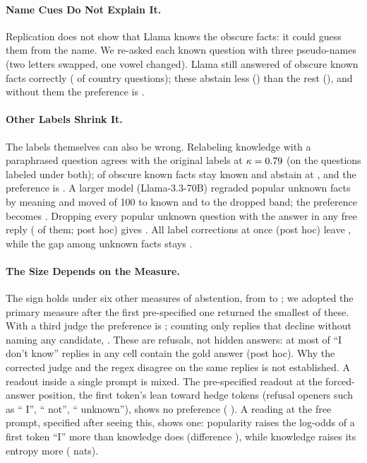 \documentclass[manuscript,screen,review,anonymous,nonacm]{acmart}
\newcommand{\idk}{``I don't know''}
\begin{document}
\paragraph{Name Cues Do Not Explain It.} Replication does not show that Llama knows the obscure facts: it could guess them from the name. We re-asked each known question with three pseudo-names (two letters swapped, one vowel changed). Llama still answered \ncObsRec{} of \ncObsProbed{} obscure known facts correctly (\ncCountryRec{} of \ncCountryN{} country questions); these abstain less (\ncRecAbs) than the rest (\ncOtherAbs), and without them the preference is \ncDiff{} \ncDiffCI.

\paragraph{Other Labels Shrink It.} The labels themselves can also be wrong. Relabeling knowledge with a paraphrased question agrees with the original labels at $\kappa=0.79$ (on the \lcBothN{} questions labeled under both); \eoObsKnownN{} of \gsObsKnownTotal{} obscure known facts stay known and abstain at \eoObsKnown, and the preference is \eoDiff{} \eoDiffCI. A larger model (Llama-3.3-70B) regraded popular unknown facts by meaning and moved \sePUKnown{} of 100 to known and \sePUInter{} to the dropped band; the preference becomes \seDiff{} \seDiffCI. Dropping every popular unknown question with the answer in any free reply (\lcPUAlias{} of them; post hoc) gives \lcAliasDrop{} \lcAliasDropCI. All label corrections at once (post hoc) leave \rcJoint{} \rcJointCI, while the gap among unknown facts stays \rcUnkJoint{} \rcUnkJointCI.

\paragraph{The Size Depends on the Measure.} The sign holds under six other measures of abstention, from \hjLlamaDiff{} to \faLlamaRegexDiff; we adopted the primary measure after the first pre-specified one returned the smallest of these. With a third judge the preference is \tjLlamaDiff; counting only replies that decline without naming any candidate, \sdDiff{} \sdDiffCI. These are refusals, not hidden answers: at most \lcDKAliasMax{} of \idk{} replies in any cell contain the gold answer (post hoc). Why the corrected judge and the regex disagree on the same replies is not established. A readout inside a single prompt is mixed. The pre-specified readout at the forced-answer position, the first token's lean toward hedge tokens (refusal openers such as `` I'', `` not'', `` unknown''), shows no preference (\loLlamaDiff{} \loLlamaDiffCI). A reading at the free prompt, specified after seeing this, shows one: popularity raises the log-odds of a first token ``I'' more than knowledge does (difference \eoFreeIDiff{} \eoFreeIDiffCI), while knowledge raises its entropy more (\eoFreeEntDiff{} \eoFreeEntDiffCI{} nats).
\end{document}
